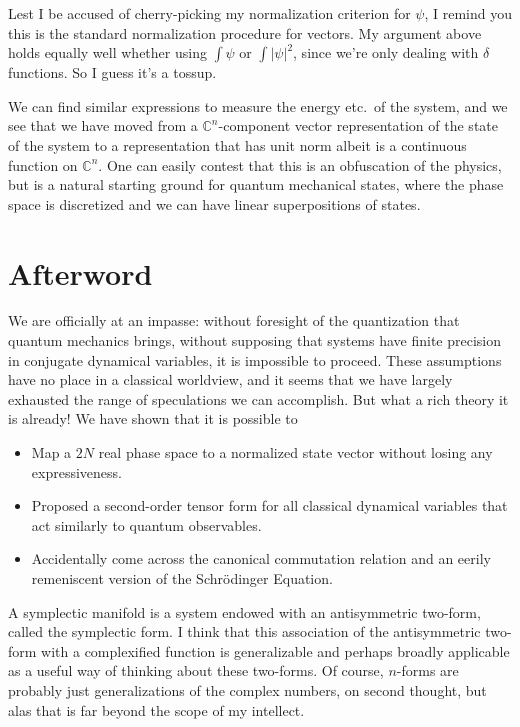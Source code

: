 \documentclass[12pt]{report}
\newcommand*{\abs}[1]{\left|#1\right|}
\begin{document}
Lest I be accused of cherry-picking my normalization criterion for $\psi$, I
remind you this is the standard normalization procedure for vectors. My argument
above holds equally well whether using $\int \psi$ or $\int \abs{\psi}^2$, since
we're only dealing with $\delta$ functions. So I guess it's a tossup.

We can find similar expressions to measure the energy etc.\ of the system, and we
see that we have moved from a $\mathbb{C}^n$-component vector representation of
the state of the system to a representation that has unit norm albeit is a
continuous function on $\mathbb{C}^n$. One can easily contest that this is an
obfuscation of the physics, but is a natural starting ground for quantum
mechanical states, where the phase space is discretized and we can have linear
superpositions of states.

\section{Afterword}

We are officially at an impasse: without foresight of the quantization that
quantum mechanics brings, without supposing that systems have finite precision
in conjugate dynamical variables, it is impossible to proceed. These assumptions
have no place in a classical worldview, and it seems that we have largely
exhausted the range of speculations we can accomplish. But what a rich theory it
is already! We have shown that it is possible to
\begin{itemize}
    \item Map a $2N$ real phase space to a normalized state vector without
        losing any expressiveness.

    \item Proposed a second-order tensor form for all classical dynamical
        variables that act similarly to quantum observables.

    \item Accidentally come across the canonical commutation relation and an
        eerily remeniscent version of the Schr\"odinger Equation.
\end{itemize}

A symplectic manifold is a system endowed with an antisymmetric two-form, called
the symplectic form. I think that this association of the antisymmetric two-form
with a complexified function is generalizable and perhaps broadly applicable as
a useful way of thinking about these two-forms. Of course, $n$-forms are
probably just generalizations of the complex numbers, on second thought, but
alas that is far beyond the scope of my intellect.
\end{document}
